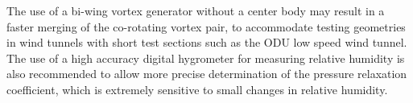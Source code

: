 The use of a 
bi-wing vortex generator without a center body may result in a faster merging 
of the co-rotating vortex pair, to accommodate testing geometries in wind 
tunnels with short test sections such as the ODU low speed wind tunnel. The use 
of a high accuracy digital hygrometer for measuring relative humidity is also 
recommended to allow more precise determination of the pressure relaxation 
coefficient, which is extremely sensitive to small changes in relative humidity.
